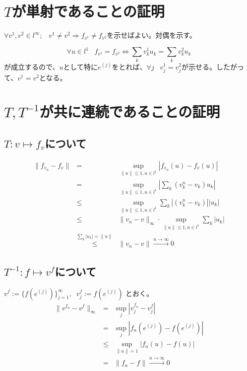 \documentclass[11pt,a4paper]{article}
\begin{document}
\section{$T$が単射であることの証明}
$\forall v^1,v^2 \in l^{\infty}; \;\;\; v^1 \neq v^2 \Rightarrow f_{v^1} \neq f_{v^2}$を示せばよい。対偶を示す。

$$\forall u \in l^1 \;\;\; f_{v^1} = f_{v^2} \Leftrightarrow \displaystyle{\sum_{k}v_k^1u_k = \sum_{k}v_k^2u_k}$$
が成立するので、$u$として特に$e^{(j)}$をとれば、$\forall j \;\;\; v_j^1 = v_j^2$が示せる。したがって、$v^1=v^2$となる。

\section{$T,T^{-1}$が共に連続であることの証明}
\subsection{$T: v \longmapsto f_v$について}
\begin{eqnarray*}
\|f_{v_n}-f_v\| &=& \sup_{\|u\| \leq 1, u \in l^1}\left|f_{v_n}(u)-f_v(u)\right| \\
&=& \sup_{\|u\| \leq 1, u \in l^1} \left| \sum_{k}(v_k^n-v_k)u_k \right| \\
&\leq& \sup_{\|u\| \leq 1, u \in l^1} \sum_{k}|(v_k^n-v_k)| |u_k| \\
&\leq& \|v_n-v\|_{\infty} \cdot \sup_{\|u\| \leq 1, u \in l^1}\sum_{k}|u_k| \\
&\overset{\sum_{k}|u_k|=\|u\|}{\leq}& \|v_n-v\| \overset{n \to \infty}{\to} 0 
\end{eqnarray*}

\subsection{$T^{-1}: f \longmapsto v^f$について}
$v^f:=\{f(e^{(j)})\}_{j=1}^{\infty}, \;\; v_j^f:=f(e^{(j)})$ とおく。
\begin{eqnarray*}
\|v^{f_n}-v^f\|_{\infty} &=& \sup_{j}|v_j^{f_n}-v_j^f| \\
&=& \sup_{j}|f_n(e^{(j)})-f(e^{(j)})| \\
&\leq& \sup_{\|u\|=1}|f_n(u)-f(u)| \\
&=& \|f_n-f\| \overset{n \to \infty}{\to} 0
\end{eqnarray*}
\end{document}
